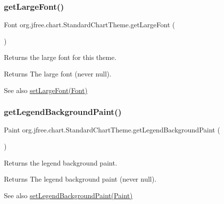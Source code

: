 \subsubsection{\texorpdfstring{get\+Large\+Font()}{getLargeFont()}}
{\footnotesize\ttfamily Font org.\+jfree.\+chart.\+Standard\+Chart\+Theme.\+get\+Large\+Font (\begin{DoxyParamCaption}{ }\end{DoxyParamCaption})}

Returns the large font for this theme.

\begin{DoxyReturn}{Returns}
The large font (never {\ttfamily null}).
\end{DoxyReturn}
\begin{DoxySeeAlso}{See also}
\mbox{\hyperlink{classorg_1_1jfree_1_1chart_1_1_standard_chart_theme_ab425d53672731d2bc1918d8916c299d7}{set\+Large\+Font(\+Font)}} 
\end{DoxySeeAlso}
\mbox{\label{classorg_1_1jfree_1_1chart_1_1_standard_chart_theme_a5288003c0d9a02190cea19ae79b510c0}} 
\subsubsection{\texorpdfstring{get\+Legend\+Background\+Paint()}{getLegendBackgroundPaint()}}
{\footnotesize\ttfamily Paint org.\+jfree.\+chart.\+Standard\+Chart\+Theme.\+get\+Legend\+Background\+Paint (\begin{DoxyParamCaption}{ }\end{DoxyParamCaption})}

Returns the legend background paint.

\begin{DoxyReturn}{Returns}
The legend background paint (never {\ttfamily null}).
\end{DoxyReturn}
\begin{DoxySeeAlso}{See also}
\mbox{\hyperlink{classorg_1_1jfree_1_1chart_1_1_standard_chart_theme_ada53066c7505682778d0bc8ed4fdab66}{set\+Legend\+Background\+Paint(\+Paint)}} 
\end{DoxySeeAlso}
\mbox{\label{classorg_1_1jfree_1_1chart_1_1_standard_chart_theme_a892baea00955745f630d087e079add9e}} 
